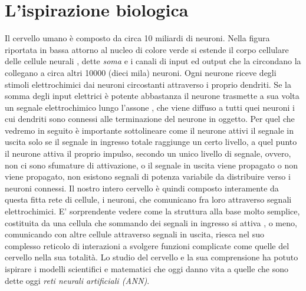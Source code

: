 \section*{L'ispirazione biologica}
Il cervello umano è composto da circa 10 miliardi di neuroni. Nella figura riportata in bassa attorno al nucleo di colore verde si estende il corpo cellulare delle cellule neurali , dette \textit{soma} e i canali di input ed output che la circondano la collegano a circa altri 10000 (dieci mila) neuroni.
Ogni neurone riceve degli stimoli elettrochimici dai neuroni circostanti attraverso i proprio dendriti. Se la somma degli input elettrici è potente abbastanza il neurone trasmette a sua volta un segnale elettrochimico lungo l'assone , che viene diffuso a tutti quei neuroni i cui dendriti sono connessi alle terminazione del neurone in oggetto.
Per quel che vedremo in seguito è importante sottolineare come il neurone attivi il segnale in uscita solo se il segnale in ingresso totale raggiunge un certo livello, a quel punto il neurone attiva il proprio impulso, secondo un unico livello di segnale, ovvero, non ci sono sfumature di attivazione, o il segnale in uscita viene propagato o non viene propagato, non esistono segnali di potenza variabile da distribuire verso i neuroni connessi.
Il nostro intero cervello è quindi composto interamente da questa fitta rete di cellule, i neuroni, che comunicano fra loro attraverso segnali elettrochimici. E' sorprendente vedere come la struttura alla base molto semplice, costituita da una cellula che sommando dei segnali in ingresso si attiva , o meno, comunicando con altre cellule attraverso segnali in uscita, riesca nel suo complesso reticolo di interazioni a svolgere funzioni complicate come quelle del cervello nella sua totalità.
Lo studio del cervello e la sua comprensione ha potuto ispirare i modelli scientifici e matematici che oggi danno vita a quelle che sono dette oggi \textit{reti neurali artificiali (ANN)}.

